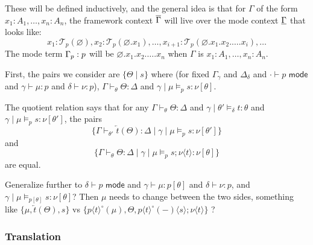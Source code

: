 \documentclass[10pt]{article}
\theoremstyle{definition}
\let\emptyset\varnothing
\newcommand{\yields}{\vdash}
\newcommand{\type}{\,\,\mathsf{mode}}
\newcommand{\rewrite}[2]{\overleftarrow{#1}(#2)}
\newcommand\TermTwoT[5]{\ensuremath{#1 \mid #3 \vDash_{#5} #2 : #4}}
\newcommand\TrCirc[2]{\ensuremath{{#1}^\circ(#2)}}
\newcommand\var[1]{\ensuremath{\mathsf{var}_{#1}}}
\newcommand{\id}{\mathsf{id}}
\newcommand\El[2]{\mathcal{T}_{#1}(#2)}
\newcommand\ApEl[2]{\mathcal{T}_{#1}\langle#2\rangle}
\newcommand\ap[2]{\ensuremath{#1 \langle #2 \rangle }}
\begin{document}
These will be defined inductively, and the general idea is that for $\Gamma$ of the form $x_1 : A_1, \ldots , x_n : A_n$, the framework context $\overline{\Gamma}$ will live over the mode context $\underline{\Gamma}$ that looks like:
  \[x_1 : \El{p}{\emptyset}, x_2 : \El{p}{\emptyset.x_1}, \ldots, x_{i+1} : \El{p}{\emptyset.x_1.x_2.\ldots.x_i},\ldots
  \]
  The mode term ${\Gamma}_p : p$ will be $\emptyset.x_1.x_2.\ldots.x_n$ when $\Gamma$ is $x_1 : A_1, \ldots , x_n : A_n$.


  First, the pairs we consider are $\{ \Theta \mid s \}$ where (for fixed
  $\Gamma_\gamma$ and $\Delta_\delta$ and $\cdot \yields p \type$ and
  $\gamma \yields \mu : p$ and $\delta \yields \nu : p$), $\Gamma
  \yields_\theta \Theta : \Delta$ and
  $\TermTwoT{\gamma}{s}{\mu}{\nu[\theta]}{p}$.

  The quotient relation says that for any
  $\Gamma
  \yields_\theta \Theta : \Delta$ and
  $\TermTwoT{\gamma}{t}{\theta'}{\theta}{\delta}$
  and 
  $\TermTwoT{\gamma}{s}{\mu}{\nu[\theta']}{p}$, the pairs
  \[
  \{ \Gamma \yields_{\theta'} \rewrite{t}{\Theta} : \Delta \mid
  \TermTwoT{\gamma}{s}{\mu}{\nu[\theta']}{p}
  \}
  \]
  and
  \[
  \{ \Gamma \yields_{\theta} {\Theta} : \Delta \mid
  \TermTwoT{\gamma}{s;\ap{\nu}{t}}{\mu}{\nu[\theta]}{p}
  \}
  \]
  are equal.

  Generalize further to
    $\delta \yields p \type$ and
    $\gamma \yields \mu : p[\theta]$ and $\delta \yields \nu : p$, and
    $\TermTwoT{\gamma}{s}{\mu}{\nu[\theta]}{p[\theta]}$?
    Then $\mu$ needs to change between the two sides, something like
    $\{ \mu, \rewrite{t}{\Theta}, s \}$
    vs
    $\{ \TrCirc{\ap{p}{t}}{\mu}, \Theta,
    \ap{\TrCirc{\ap{p}{t}}{-}}{s};\ap{\nu}{t} \}$ ?
    
\subsubsection{Translation}

\end{document}

